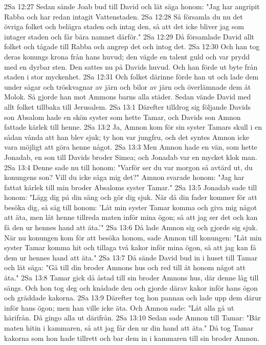 2Sa 12:27  Sedan sände Joab bud till David och lät säga honom: "Jag har angripit Rabba och har redan intagit Vattenstaden.
2Sa 12:28  Så församla du nu det övriga folket och belägra staden och intag den, så att det icke bliver jag som intager staden och får bära namnet därför."
2Sa 12:29  Då församlade David allt folket och tågade till Rabba och angrep det och intog det.
2Sa 12:30  Och han tog deras konungs krona från hans huvud; den vägde en talent guld och var prydd med en dyrbar sten. Den sattes nu på Davids huvud. Och han förde ut byte från staden i stor myckenhet.
2Sa 12:31  Och folket därinne förde han ut och lade dem under sågar och tröskvagnar av järn och bilor av järn och överlämnade dem åt Molok. Så gjorde han mot Ammons barns alla städer. Sedan vände David med allt folket tillbaka till Jerusalem.
2Sa 13:1  Därefter tilldrog sig följande Davids son Absalom hade en skön syster som hette Tamar, och Davids son Amnon fattade kärlek till henne.
2Sa 13:2  Ja, Amnon kom för sin syster Tamars skull i en sådan vånda att han blev sjuk; ty hon var jungfru, och det syntes Amnon icke vara möjligt att göra henne något.
2Sa 13:3  Men Amnon hade en vän, som hette Jonadab, en son till Davids broder Simea; och Jonadab var en mycket klok man.
2Sa 13:4  Denne sade nu till honom: "Varför ser du var morgon så avtärd ut, du konungens son? Vill du icke säga mig det?" Amnon svarade honom: "Jag har fattat kärlek till min broder Absaloms syster Tamar."
2Sa 13:5  Jonadab sade till honom: "Lägg dig på din säng och gör dig sjuk. När då din fader kommer för att besöka dig, så säg till honom: 'Låt min syster Tamar komma och giva mig något att äta, men låt henne tillreda maten inför mina ögon; så att jag ser det och kan få den ur hennes hand att äta.'"
2Sa 13:6  Då lade Amnon sig och gjorde sig sjuk. När nu konungen kom för att besöka honom, sade Amnon till konungen: "Låt min syster Tamar komma hit och tillaga två kakor inför mina ögon, så att jag kan få dem ur hennes hand att äta."
2Sa 13:7  Då sände David bud in i huset till Tamar och lät säga: "Gå till din broder Amnons hus och red till åt honom något att äta."
2Sa 13:8  Tamar gick då åstad till sin broder Amnons hus, där denne låg till sängs. Och hon tog deg och knådade den och gjorde därav kakor inför hans ögon och gräddade kakorna.
2Sa 13:9  Därefter tog hon pannan och lade upp dem därur inför hans ögon; men han ville icke äta. Och Amnon sade: "Låt alla gå ut härifrån. Då gingo alla ut därifrån.
2Sa 13:10  Sedan sade Amnon till Tamar: "Bär maten hitin i kammaren, så att jag får den ur din hand att äta." Då tog Tamar kakorna som hon hade tillrett och bar dem in i kammaren till sin broder Amnon.
